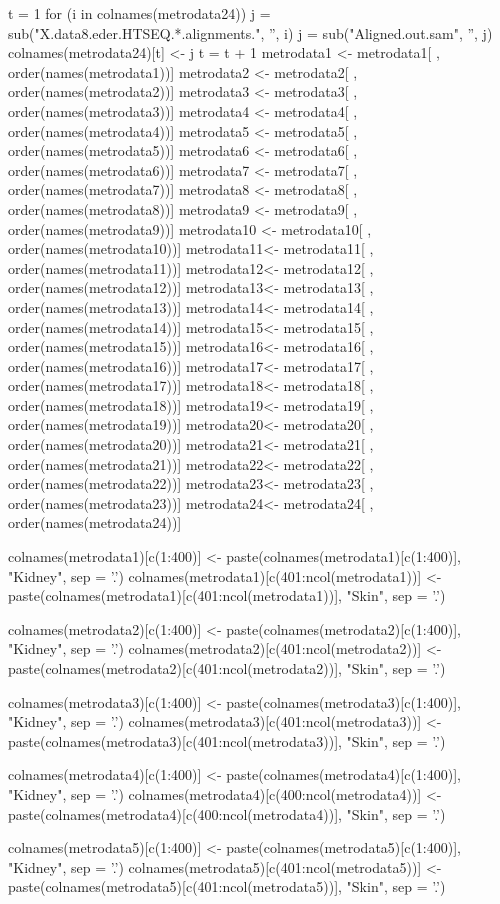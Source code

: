 \documentclass[10pt]{article}
\begin{document}
t = 1
for (i in colnames(metrodata24)){
  j = sub("X.data8.eder.HTSEQ.*.alignments.", '', i)
  j = sub("Aligned.out.sam", '', j)
  colnames(metrodata24)[t] <- j
  t = t + 1
}
metrodata1 <- metrodata1[ , order(names(metrodata1))]
metrodata2 <- metrodata2[ , order(names(metrodata2))]
metrodata3 <- metrodata3[ , order(names(metrodata3))]
metrodata4 <- metrodata4[ , order(names(metrodata4))]
metrodata5 <- metrodata5[ , order(names(metrodata5))]
metrodata6 <- metrodata6[ , order(names(metrodata6))]
metrodata7 <- metrodata7[ , order(names(metrodata7))]
metrodata8 <- metrodata8[ , order(names(metrodata8))]
metrodata9 <- metrodata9[ , order(names(metrodata9))]
metrodata10 <- metrodata10[ , order(names(metrodata10))]
metrodata11<- metrodata11[ , order(names(metrodata11))]
metrodata12<- metrodata12[ , order(names(metrodata12))]
metrodata13<- metrodata13[ , order(names(metrodata13))]
metrodata14<- metrodata14[ , order(names(metrodata14))]
metrodata15<- metrodata15[ , order(names(metrodata15))]
metrodata16<- metrodata16[ , order(names(metrodata16))]
metrodata17<- metrodata17[ , order(names(metrodata17))]
metrodata18<- metrodata18[ , order(names(metrodata18))]
metrodata19<- metrodata19[ , order(names(metrodata19))]
metrodata20<- metrodata20[ , order(names(metrodata20))]
metrodata21<- metrodata21[ , order(names(metrodata21))]
metrodata22<- metrodata22[ , order(names(metrodata22))]
metrodata23<- metrodata23[ , order(names(metrodata23))]
metrodata24<- metrodata24[ , order(names(metrodata24))]

colnames(metrodata1)[c(1:400)] <- paste(colnames(metrodata1)[c(1:400)], "Kidney", sep = '.')
colnames(metrodata1)[c(401:ncol(metrodata1))] <- paste(colnames(metrodata1)[c(401:ncol(metrodata1))], "Skin", sep = '.')

colnames(metrodata2)[c(1:400)] <- paste(colnames(metrodata2)[c(1:400)], "Kidney", sep = '.')
colnames(metrodata2)[c(401:ncol(metrodata2))] <- paste(colnames(metrodata2)[c(401:ncol(metrodata2))], "Skin", sep = '.')

colnames(metrodata3)[c(1:400)] <- paste(colnames(metrodata3)[c(1:400)], "Kidney", sep = '.')
colnames(metrodata3)[c(401:ncol(metrodata3))] <- paste(colnames(metrodata3)[c(401:ncol(metrodata3))], "Skin", sep = '.')

colnames(metrodata4)[c(1:400)] <- paste(colnames(metrodata4)[c(1:400)], "Kidney", sep = '.')
colnames(metrodata4)[c(400:ncol(metrodata4))] <- paste(colnames(metrodata4)[c(400:ncol(metrodata4))], "Skin", sep = '.')

colnames(metrodata5)[c(1:400)] <- paste(colnames(metrodata5)[c(1:400)], "Kidney", sep = '.')
colnames(metrodata5)[c(401:ncol(metrodata5))] <- paste(colnames(metrodata5)[c(401:ncol(metrodata5))], "Skin", sep = '.')
\end{document}

